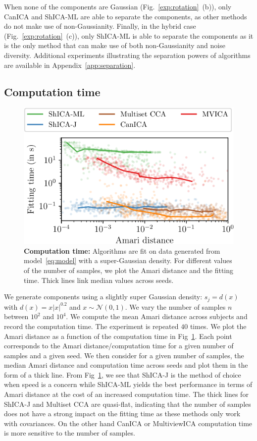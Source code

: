 When none of the components are Gaussian (Fig.~\ref{exp:rotation}~(b)), only CanICA and ShICA-ML are able to separate the components, as other methods do not make use of non-Gaussianity.
Finally, in the hybrid case (Fig.~\ref{exp:rotation}~(c)), only ShICA-ML is able to separate the components as it is the only method that can make use of both non-Gaussianity and noise diversity. Additional experiments illustrating the separation powers of algorithms are available in Appendix~\ref{app:separation}.
%

\vspace{-1.5em}
\subsection{Computation time}
\begin{figure}
    \centering
    \vspace{-1em}
    \includegraphics[width=.99\linewidth]{./figures/amvica/synthetic_gaussian_timings.pdf}
    \caption{\textbf{Computation time: } Algorithms are fit on data generated from model~\eqref{eq:model} with a super-Gaussian density. For different values of the number of samples, we plot the Amari distance and the fitting time. Thick lines link median values across seeds.}
    \label{exp:syn_timings}
\end{figure}
We generate components using a slightly super Gaussian density: $s_j = d(x)$ with $d(x) = x |x|^{0.2}$ and $x \sim \mathcal{N}(0, 1)$. We vary the number of samples $n$ between $10^2$ and $10^4$. We compute the mean Amari distance across subjects and record the computation time. The experiment is repeated $40$ times. We plot the Amari distance as a function of the computation time in Fig~\ref{exp:syn_timings}. Each point corresponds to the Amari distance/computation time for a given number of samples and a given seed. We then consider for a given number of samples, the median Amari distance and computation time across seeds and plot them in the form of a thick line.  From Fig~\ref{exp:syn_timings}, we see that ShICA-J is the method of choice when speed is a concern while ShICA-ML yields the best performance in terms of Amari distance at the cost of an increased computation time. The thick lines for ShICA-J and Multiset CCA are quasi-flat, indicating that the number of samples does not have a strong impact on the fitting time as these methods only work with covariances. On the other hand CanICA or MultiviewICA computation time is more sensitive to the number of samples.
